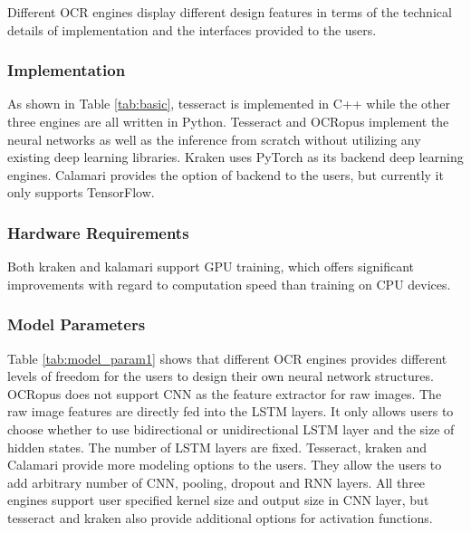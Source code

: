 \documentclass[conference]{IEEEtran}
\begin{document}

Different OCR engines display different design features in terms of the
technical details of implementation and the interfaces provided to the users.

\subsubsection*{Implementation}

As shown in Table \ref{tab:basic}, tesseract is implemented in C++ while the
other three engines are all written in Python. Tesseract and OCRopus
implement the neural networks as well as the inference from scratch without
utilizing any existing deep learning libraries. Kraken uses PyTorch as its
backend deep learning engines. Calamari provides the option of backend to the
users, but currently it only supports TensorFlow.

\subsubsection*{Hardware Requirements}

Both kraken and kalamari support GPU training, which offers significant
improvements with regard to computation speed than training on CPU devices.

\subsubsection*{Model Parameters}

Table \ref{tab:model_param1} shows that different OCR engines provides
different levels of freedom for the users to design their own neural network
structures. OCRopus does not support CNN as the feature extractor for raw
images. The raw image features are directly fed into the LSTM layers. It only
allows users to choose whether to use bidirectional or unidirectional LSTM
layer and the size of hidden states. The number of LSTM layers are fixed.
Tesseract, kraken and Calamari provide more modeling options to the users. They
allow the users to add arbitrary number of CNN, pooling, dropout and RNN
layers. All three engines support user specified kernel size and output size in
CNN layer, but tesseract and kraken also provide additional options for
activation functions.
\end{document}
